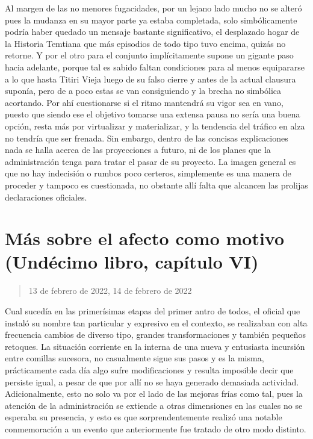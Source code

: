 \documentclass[
]{book}
\begin{document}
Al margen de las no menores fugacidades, por un lejano lado mucho no se alteró pues la mudanza en su mayor parte ya estaba completada, solo simbólicamente podría haber quedado un mensaje bastante significativo, el desplazado hogar de la Historia Temtiana que más episodios de todo tipo tuvo encima, quizás no retorne. Y por el otro para el conjunto implícitamente supone un gigante paso hacia adelante, porque tal es sabido faltan condiciones para al menos equipararse a lo que hasta Titiri Vieja luego de su falso cierre y antes de la actual clausura suponía, pero de a poco estas se van consiguiendo y la brecha no simbólica acortando. Por ahí cuestionarse si el ritmo mantendrá su vigor sea en vano, puesto que siendo ese el objetivo tomarse una extensa pausa no sería una buena opción, resta más por virtualizar y materializar, y la tendencia del tráfico en alza no tendría que ser frenada. Sin embargo, dentro de las concisas explicaciones nada se halla acerca de las proyecciones a futuro, ni de los planes que la administración tenga para tratar el pasar de su proyecto. La imagen general es que no hay indecisión o rumbos poco certeros, simplemente es una manera de proceder y tampoco es cuestionada, no obstante allí falta que alcancen las prolijas declaraciones oficiales.

\hypertarget{muxe1s-sobre-el-afecto-como-motivo-unduxe9cimo-libro-capuxedtulo-vi}{%
\section{Más sobre el afecto como motivo (Undécimo libro, capítulo VI)}\label{muxe1s-sobre-el-afecto-como-motivo-unduxe9cimo-libro-capuxedtulo-vi}}

\begin{quote}
13 de febrero de 2022, 14 de febrero de 2022
\end{quote}

Cual sucedía en las primerísimas etapas del primer antro de todos, el oficial que instaló su nombre tan particular y expresivo en el contexto, se realizaban con alta frecuencia cambios de diverso tipo, grandes transformaciones y también pequeños retoques. La situación corriente en la interna de una nueva y entusiasta incursión entre comillas sucesora, no casualmente sigue sus pasos y es la misma, prácticamente cada día algo sufre modificaciones y resulta imposible decir que persiste igual, a pesar de que por allí no se haya generado demasiada actividad. Adicionalmente, esto no solo va por el lado de las mejoras frías como tal, pues la atención de la administración se extiende a otras dimensiones en las cuales no se esperaba su presencia, y esto es que sorprendentemente realizó una notable conmemoración a un evento que anteriormente fue tratado de otro modo distinto.
\end{document}

